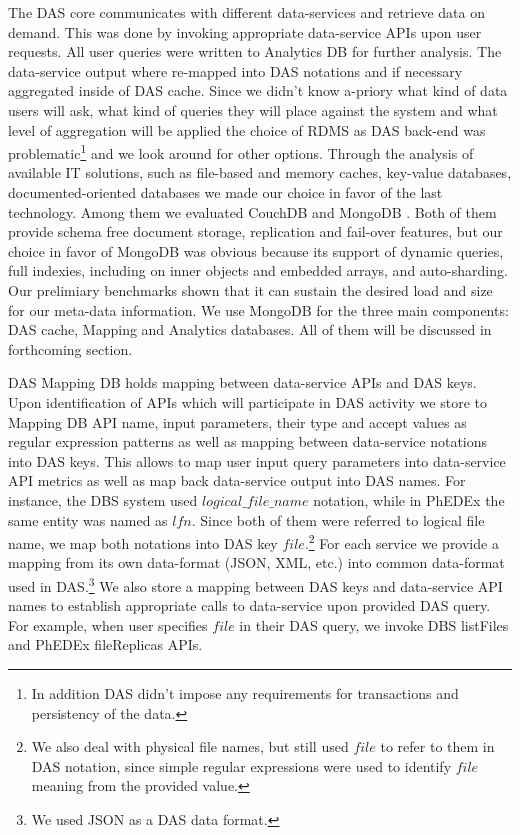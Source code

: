 \documentclass[a4paper]{jpconf}
\begin{document}
The DAS core communicates with different data-services and retrieve
data on demand. This was done by invoking appropriate data-service APIs
upon user requests. All user queries were written to Analytics DB
for further analysis. The data-service output where re-mapped into
DAS notations and if necessary aggregated inside of DAS cache.
Since we didn't know a-priory what kind of data users will ask, 
what kind of queries they will place against the system and what
level of aggregation will be applied the choice
of RDMS as DAS back-end was problematic\footnote{In addition DAS 
didn't impose any requirements for transactions and persistency of the data.} 
and we look around for other options. Through the analysis of available IT solutions, 
such as file-based and memory caches, 
key-value databases, documented-oriented databases we made our choice in favor 
of the last technology. Among them we evaluated CouchDB \cite{CouchDB} and 
MongoDB \cite{MongoDB}. Both of them provide schema free document
storage, replication and fail-over features, but our choice in favor of 
MongoDB was obvious because its support of dynamic queries, 
full indexies, including on inner objects and embedded arrays,
and auto-sharding. Our prelimiary benchmarks shown that it can sustain
the desired load and size for our meta-data information. We use MongoDB for
the three main components: DAS cache, Mapping and Analytics databases. All of them
will be discussed in forthcoming section.

DAS Mapping DB holds mapping between data-service APIs and DAS keys. 
Upon identification of APIs which will participate in DAS activity 
we store to Mapping DB API name, input parameters, their type and accept 
values as regular expression patterns as well as mapping between data-service 
notations into DAS keys. This allows to map user input query parameters into
data-service API metrics as well as map back data-service output into DAS names.
For instance, the DBS system used $logical\_file\_name$ notation, while in PhEDEx
\cite{PhEDEx}
the same entity was named as $lfn$. Since both of them were referred to
logical file name, we map both notations into DAS key $file$.\footnote{We
also deal with physical file names, but still used $file$ to refer to them in
DAS notation, since simple regular expressions were used to identify $file$
meaning from the provided value.}
For each service we provide a mapping from its own data-format (JSON, XML, etc.) into
common data-format used in DAS.\footnote{We used JSON as a DAS data format.}
We also store a mapping between DAS keys and data-service API names to
establish appropriate calls to data-service upon provided DAS query. For example,
when user specifies $file$ in their DAS query, we invoke DBS listFiles and PhEDEx
fileReplicas APIs. 
\end{document}
